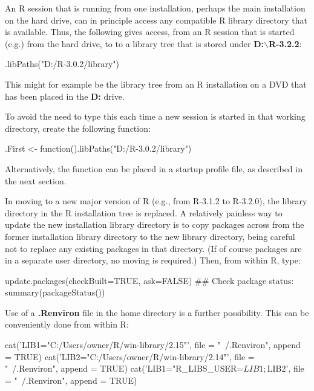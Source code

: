 \documentclass{tufte-book}\usepackage[]{graphicx}\usepackage[]{color}
\begin{document}
An R session that is running from one installation, perhaps the main
installation on the hard drive, can in principle access any compatible
R library directory that is available.  Thus, the
following gives access, from an R session that is started (e.g.) from
the hard drive, to to a library tree that is stored under
\textbf{D:$\boldsymbol{\backslash}$R-3.2.2}:
\begin{Schunk}
\begin{Sinput}
.libPaths("D:/R-3.0.2/library")
\end{Sinput}
\end{Schunk}
\noindent
This might for example be the library tree from an R installation on a
DVD that has been placed in the \textbf{D:} drive.

To avoid the need to type this each time a new session is started in
that working directory, create the following function:
\begin{Schunk}
\begin{Sinput}
.First <- function().libPaths("D:/R-3.0.2/library")
\end{Sinput}
\end{Schunk}
\noindent
Alternatively, the function can be placed in a startup profile file,
as described in the next section.

In moving to a new major version of R (e.g., from R-3.1.2 to
R-3.2.0), the library directory in the R installation tree is
replaced.  A relatively painless way to update the new installation
library directory is to copy packages across from the former
installation library directory to the new library directory, being
careful not to replace any existing packages in that directory.  (If
of course packages are in a separate user directory, no moving is
required.)  Then, from within R, type:
\begin{Schunk}
\begin{Sinput}
update.packages(checkBuilt=TRUE, ask=FALSE)
## Check package status:
summary(packageStatus())
\end{Sinput}
\end{Schunk}

Use of a {\bf .Renviron} file in the home directory is a further
possibility. This can be conveniently done from within R:
\begin{Schunk}
\begin{Sinput}
cat('LIB1="C:/Users/owner/R/win-library/2.15"\n',
    file = "~/.Renviron", append = TRUE)
cat('LIB2="C:/Users/owner/R/win-library/2.14"\n',
    file = "~/.Renviron", append = TRUE)
cat('LIB1="R_LIBS_USER=${LIB1};${LIB2}\n',
    file = "~/.Renviron", append = TRUE)
\end{Sinput}
\end{Schunk}
\end{document}
